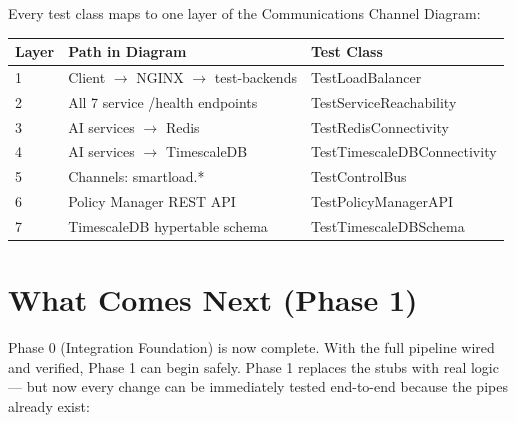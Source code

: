 \documentclass[12pt, a4paper]{article}
\begin{document}
Every test class maps to one layer of the Communications Channel Diagram:

\begin{center}
\begin{tabular}{lll}
  \toprule
  \textbf{Layer} & \textbf{Path in Diagram} & \textbf{Test Class} \\
  \midrule
  1 & Client $\to$ NGINX $\to$ test-backends & TestLoadBalancer \\
  2 & All 7 service /health endpoints & TestServiceReachability \\
  3 & AI services $\to$ Redis & TestRedisConnectivity \\
  4 & AI services $\to$ TimescaleDB & TestTimescaleDBConnectivity \\
  5 & Channels: smartload.* & TestControlBus \\
  6 & Policy Manager REST API & TestPolicyManagerAPI \\
  7 & TimescaleDB hypertable schema & TestTimescaleDBSchema \\
  \bottomrule
\end{tabular}
\end{center}

\section{What Comes Next (Phase 1)}

Phase 0 (Integration Foundation) is now complete. With the full pipeline wired
and verified, Phase 1 can begin safely. Phase 1 replaces the stubs with real
logic --- but now every change can be immediately tested end-to-end because
the pipes already exist:
\end{document}
